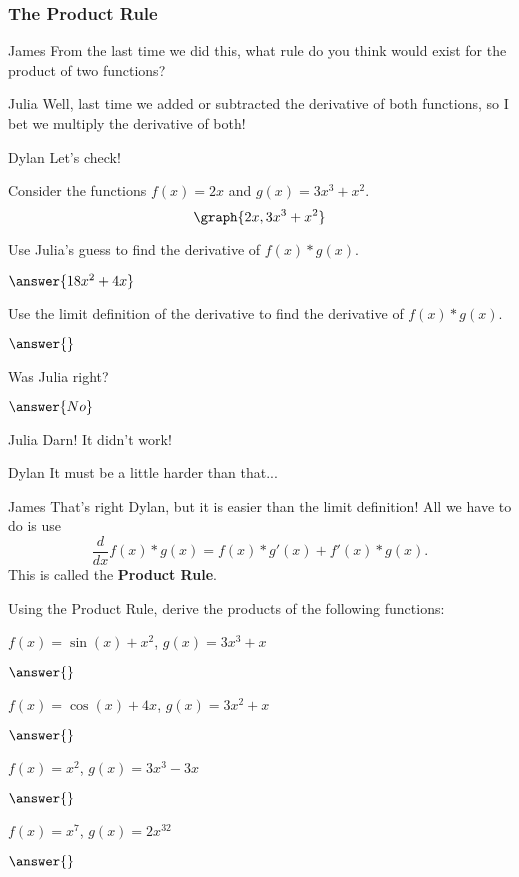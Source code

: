 \documentclass{ximera}
\begin{document}
\subsubsection{The Product Rule}
\begin{dialogue}
\item[James] From the last time we did this, what rule do you think would exist for the product of two functions?
\item[Julia] Well, last time we added or subtracted the derivative of both functions, so I bet we multiply the derivative of both!
\item[Dylan] Let's check!
\end{dialogue}
Consider the functions $f(x) = 2x$ and $g(x) = 3x^3 + x^2$.
\[
\graph{2x, 3x^3+x^2}
\]
\begin{question}
Use Julia's guess to find the derivative of $f(x) * g(x)$.

$\answer{18x^2+4x}$

Use the limit definition of the derivative to find the derivative of $f(x) * g(x)$.

$\answer{}$

Was Julia right?

$\answer{No}$
\end{question}
\begin{dialogue}
\item[Julia] Darn! It didn't work!
\item[Dylan] It must be a little harder than that...
\item[James] That's right Dylan, but it is easier than the limit definition! All we have to do is use $$\frac{d}{dx} f(x)*g(x) = f(x)*g'(x) + f'(x)*g(x)\text{.}$$ This is called the \textbf{Product Rule}.
\end{dialogue}
\begin{question}
Using the Product Rule, derive the products of the following functions:

$f(x) = \sin(x)+x^2$, $g(x) = 3x^3+x$

$\answer{}$

$f(x) = \cos(x)+4x$, $g(x) = 3x^2+x$

$\answer{}$

$f(x) = x^2$, $g(x) = 3x^3-3x$

$\answer{}$

$f(x) = x^7$, $g(x) = 2x^32$

$\answer{}$

\end{question}
\end{document}
